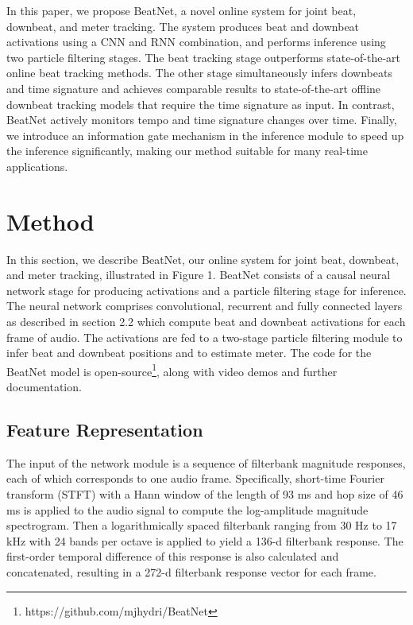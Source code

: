 \documentclass{article}
\begin{document}
In this paper, we propose BeatNet, a novel online system for joint beat, downbeat, and meter tracking. The system produces beat and downbeat activations using a CNN and RNN combination, and performs inference using two particle filtering stages. The beat tracking stage outperforms state-of-the-art online beat tracking methods. The other stage simultaneously infers downbeats and time signature and achieves comparable results to state-of-the-art offline downbeat tracking models that require the time signature as input.
In contrast, BeatNet actively monitors tempo and time signature changes over time. Finally, we introduce an information gate mechanism in the inference module to speed up the inference significantly, making our method suitable for many real-time applications.

\section{Method}
\label{sec:method}
In this section, we describe BeatNet, our online system for joint beat, downbeat, and meter tracking, illustrated in Figure 1. BeatNet consists of a causal neural network stage for producing activations and a particle filtering stage for inference. The neural network comprises convolutional, recurrent and fully connected layers as described in section 2.2 which compute beat and downbeat activations for each frame of audio. The activations are fed to a two-stage particle filtering module to infer beat and downbeat positions and to estimate meter. The code for the BeatNet model is open-source\footnote{https://github.com/mjhydri/BeatNet}, along with video demos and further documentation.



\subsection{Feature Representation}
The input of the network module is a sequence of filterbank magnitude responses, each of which corresponds to one audio frame. Specifically, short-time Fourier transform (STFT) with a Hann window of the length of 93 ms and hop size of 46 ms is applied to the audio signal to compute the log-amplitude magnitude spectrogram. Then a logarithmically spaced filterbank ranging from 30 Hz to 17 kHz with 24 bands per octave is applied to yield a 136-d filterbank response. The first-order temporal difference of this response is also calculated and concatenated, resulting in a 272-d filterbank response vector for each frame.
\end{document}
